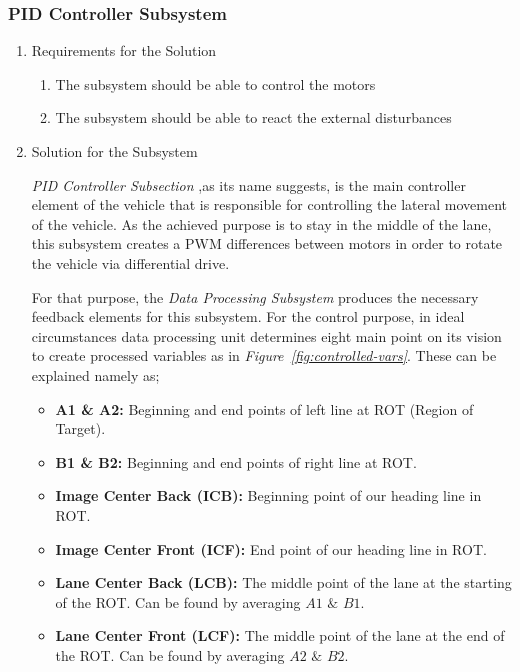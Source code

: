 \documentclass[a4paper,12pt]{article}
\begin{document}
		
		
		\subsubsection{PID Controller Subsystem}
		
			\begin{enumerate}
				\item {Requirements for the Solution}
			
				\begin{enumerate}
						\item The subsystem should be able to control the motors
						\item The subsystem should be able to react the external disturbances
					\end{enumerate} 
					
				\item {Solution for the Subsystem}
				
	\textit{PID Controller Subsection} ,as its name suggests, is the main controller element of the vehicle that is responsible for controlling the lateral movement of the vehicle. As the achieved purpose is to stay in the middle of the lane, this subsystem creates a PWM differences between motors in order to rotate the vehicle via differential drive. 
	
	For that purpose, the \textit{Data Processing Subsystem} produces the necessary feedback elements for this subsystem. For the control purpose, in ideal circumstances data processing unit determines eight main point on its vision to create processed variables as in \textit{Figure~\ref{fig:controlled-vars}}. These can be explained namely as;
	\begin{itemize}
		\item \textbf{A1 \& A2:} Beginning and end points of left line at ROT (Region of Target).
		\item \textbf{B1 \& B2:} Beginning and end points of right line at ROT.	
		\item \textbf{Image Center Back (ICB):} Beginning point of our heading line in ROT.
		\item \textbf{Image Center Front (ICF):} End point of our heading line in ROT.  
		\item \textbf{Lane Center Back (LCB):} The middle point of the lane at the starting of the ROT. Can be found by averaging $A1$ $\&$ $B1$.
		\item \textbf{Lane Center Front (LCF):} The middle point of the lane at the end of the ROT. Can be found by averaging $A2$ $\&$ $B2$.
	\end{itemize}	   
				

\end{enumerate}
\end{document}
